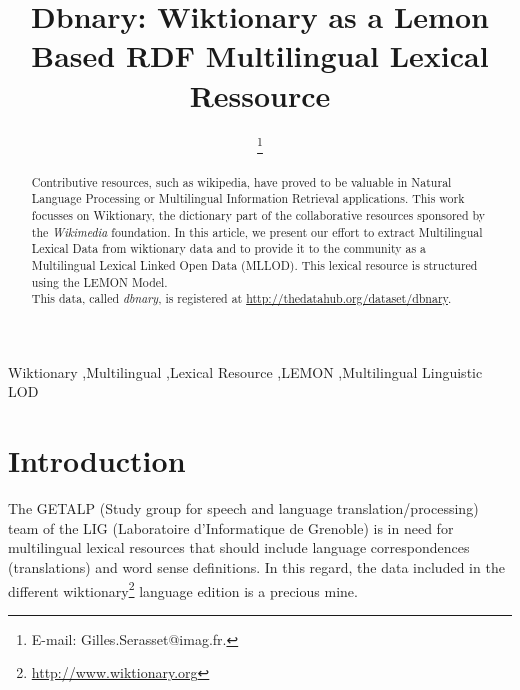 \documentclass[sw]{iosart2c}
\begin{document}
\begin{frontmatter}

\title{Dbnary: Wiktionary as a Lemon Based RDF Multilingual Lexical Ressource}
\runningtitle{}



\author{ \thanks{E-mail: Gilles.Serasset@imag.fr.}}
\address{GETALP-LIG, UJF-Grenoble 1 \\BP 53, 38051 Grenoble cedex 9, France\\ \texttt{gilles.serasset@imag.fr}}
\runningauthor{}


\begin{abstract}
Contributive resources, such as wikipedia, have proved to be valuable in Natural Language Processing or Multilingual Information Retrieval applications. This work focusses on Wiktionary, the dictionary part of the collaborative resources sponsored by the \emph{Wikimedia} foundation. In this article, we present our effort to extract Multilingual Lexical Data from wiktionary data and to provide it to the community as a Multilingual Lexical Linked Open Data (MLLOD). This lexical resource is structured using the LEMON Model.\\
This data, called \textit{dbnary}, is registered at \url{http://thedatahub.org/dataset/dbnary}.
\end{abstract}

\begin{keyword}
Wiktionary \sep Multilingual \sep Lexical Resource \sep LEMON \sep Multilingual Linguistic LOD
\end{keyword}

\end{frontmatter}

\section{Introduction}

The GETALP (Study group for speech and language translation/processing) team of the LIG (Laboratoire d'Informatique de Grenoble) is in need for multilingual lexical resources that should include language correspondences (translations) and word sense definitions. In this regard, the data included in the different wiktionary\footnote{\url{http://www.wiktionary.org}} language edition is a precious mine.
\end{document}
